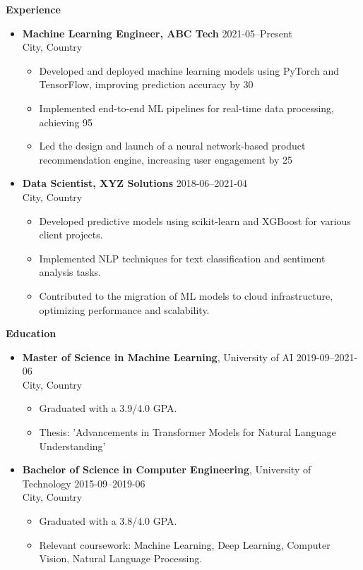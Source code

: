 \documentclass[10pt]{article}
\begin{document}
    \vspace{10pt}
    \noindent \textbf{Experience}
    \begin{itemize}[leftmargin=0.2in]
    
        \item \textbf{Machine Learning Engineer, ABC Tech} \hfill 2021-05--Present \\
        City, Country
        \begin{itemize}[leftmargin=0.3in]
        \item Developed and deployed machine learning models using PyTorch and TensorFlow, improving prediction accuracy by 30%
\item Implemented end-to-end ML pipelines for real-time data processing, achieving 95%
\item Led the design and launch of a neural network-based product recommendation engine, increasing user engagement by 25%
\end{itemize}\n
        \item \textbf{Data Scientist, XYZ Solutions} \hfill 2018-06--2021-04 \\
        City, Country
        \begin{itemize}[leftmargin=0.3in]
        \item Developed predictive models using scikit-learn and XGBoost for various client projects.
\item Implemented NLP techniques for text classification and sentiment analysis tasks.
\item Contributed to the migration of ML models to cloud infrastructure, optimizing performance and scalability.
\end{itemize}\n\end{itemize}\n
    \vspace{10pt}
    \noindent \textbf{Education}
    \begin{itemize}[leftmargin=0.2in]
    
        \item \textbf{Master of Science in Machine Learning}, University of AI \hfill 2019-09--2021-06 \\
        City, Country
        \begin{itemize}[leftmargin=0.3in]
        \item Graduated with a 3.9/4.0 GPA.
\item Thesis: 'Advancements in Transformer Models for Natural Language Understanding'
\end{itemize}\n
        \item \textbf{Bachelor of Science in Computer Engineering}, University of Technology \hfill 2015-09--2019-06 \\
        City, Country
        \begin{itemize}[leftmargin=0.3in]
        \item Graduated with a 3.8/4.0 GPA.
\item Relevant coursework: Machine Learning, Deep Learning, Computer Vision, Natural Language Processing.
\end{itemize}\n\end{itemize}\n
\end{document}

